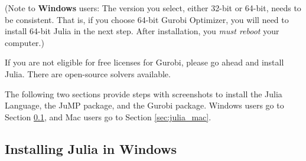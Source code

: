 (Note to \textbf{Windows} users: The version you select, either 32-bit or 64-bit, needs to be consistent. That is, if you choose 64-bit Gurobi Optimizer, you will need to install 64-bit Julia in the next step. After installation, you \emph{must reboot} your computer.)

If you are not eligible for free licenses for Gurobi, please go ahead and install Julia. There are open-source solvers available.

The following two sections provide steps with screenshots to install the Julia Language, the JuMP package, and the Gurobi package. Windows users go to Section \ref{sec:julia_win}, and Mac users go to Section \ref{sec:julia_mac}.







\subsection{Installing Julia in Windows} \label{sec:julia_win}

